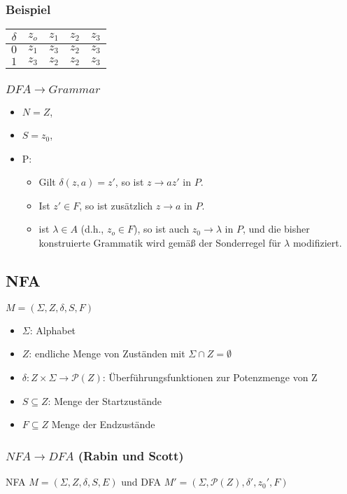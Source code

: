 \documentclass[9pt]{scrartcl}
\begin{document}
\subsubsection{Beispiel}
	\begin{tabular}{|c||c|c|c|c|}
		\hline
		$\delta$ & $z_o$ & $z_1$ & $z_2$ & $z_3$\\
		\hline \hline
		$0$ & $z_1$ & $z_3$ & $z_2$ & $z_3$\\
		\hline
		$1$ & $z_3$ & $z_2$ & $z_2$ & $z_3$\\
		\hline
	\end{tabular}
\subsubsection{$DFA \rightarrow Grammar$}
	\begin{itemize}
		\item $N = Z$,
		\item $S = z_0$,
		\item P:
		\begin{itemize}
			\item Gilt $\delta(z, a) = z'$, so ist $z \rightarrow az'$ in $P$.
			\item Ist $z' \in F$, so ist zusätzlich $z \rightarrow a$ in $P$.
			\item ist $\lambda \in A$ (d.h., $z_o \in F$), so ist auch $z_0 \rightarrow \lambda$ in $P$, und die bisher konstruierte Grammatik wird gemäß der Sonderregel für $\lambda$ modifiziert.
		\end{itemize}
	\end{itemize}
\subsection{NFA}
$M=(\Sigma, Z, \delta, S, F)$
\begin{itemize}
	\item $\Sigma$: Alphabet
	\item $Z$: endliche Menge von Zuständen mit $\Sigma \cap Z = \emptyset$
	\item $\delta: Z \times \Sigma \rightarrow \mathcal{P}(Z)$: Überführungsfunktionen zur Potenzmenge von Z
	\item $S \subseteq Z$: Menge der Startzustände
	\item $F \subseteq Z$ Menge der Endzustände
\end{itemize}
\subsubsection{$NFA \rightarrow DFA$ (Rabin und Scott)}
NFA $M = (\Sigma, Z, \delta, S, E)$ und DFA $M' = (\Sigma, \mathcal{P}(Z), \delta', z_0', F)$
\begin{itemize}
	\item zustandsmenge von $M'$: $\mathcal{P}(Z)$,
	\item $\delta'(Z', a)= \cup_{z\inZ'}\delta(z, a)=\hat\delta(Z', a)$ für, all $Z' \subseteq Z$ und $a \in \Sigma$,
	\item $z_o' = S$,
	\item $F = \{Z' \subseteq Z | Z' \cap E \not \emptyset}$
\end{itemize}
\end{document}
